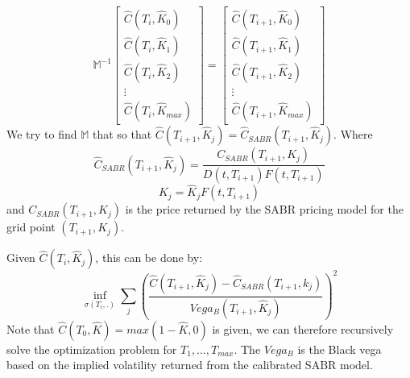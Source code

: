 \documentclass[letterpaper,12pt,titlepage,oneside,final]{book}
\numberwithin{equation}{section}
\theoremstyle{definition}
\begin{document}
\[\mathcal{\mathbb{M}}^{-1} \begin{bmatrix}
	\widehat{C}(T_{i},\widehat{K}_0)\\
	\widehat{C}(T_{i},\widehat{K}_1)\\
	\widehat{C}(T_{i},\widehat{K}_2)\\
	\vdots\\
	\widehat{C}(T_{i},\widehat{K}_{max})
	\end{bmatrix}=
	\begin{bmatrix}
	\widehat{C}(T_{i+1},\widehat{K}_0)\\
	\widehat{C}(T_{i+1},\widehat{K}_1)\\
	\widehat{C}(T_{i+1},\widehat{K}_2)\\
	\vdots\\
	\widehat{C}(T_{i+1},\widehat{K}_{max})
	\end{bmatrix}
	\]
	We try to find $\mathcal{\mathbb{M}}$ that so that $\widehat{C}(T_{i+1},\widehat{K}_j)=\widehat{C}_{SABR}(T_{i+1},\widehat{K}_j)$.
	Where
	\[
	\widehat{C}_{SABR}(T_{i+1},\widehat{K}_j)=\frac{C_{SABR}(T_{i+1},K_j)}{D(t,T_{i+1})F(t,T_{i+1})}
	\]
	\[
	K_j=\widehat{K}_j F(t,T_{i+1})
	\]
	and $C_{SABR}(T_{i+1},K_j)$ is the price returned by the SABR pricing model for the grid point $(T_{i+1},K_j)$.

	Given $\widehat{C}(T_{i},\widehat{K}_j)$, this can be done by:
	\begin{equation}
	\inf_{\sigma(T_i,.)} \sum_{j}(\frac{\widehat{C}(T_{i+1},\widehat{K}_j)-\widehat{C}_{SABR}(T_{i+1},k_j)}{Vega_{B}(T_{i+1},\widehat{K}_j)})^2
	\label{eq:LVFCal}
 	\end{equation}
	Note that $\widehat{C}(T_0,\widehat{K})=max(1-\widehat{K},0)$ is given, we can therefore recursively solve the optimization problem for $T_1, \dots, T_{max}$. The $Vega_{B}$ is the Black vega based on the implied volatility returned from the calibrated SABR model.
\end{document}
